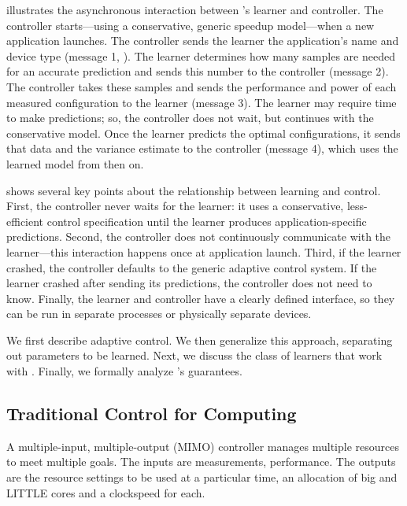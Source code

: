  illustrates the asynchronous interaction between
\SYSTEM{}'s learner and controller. The controller starts---using a
conservative, generic speedup model---when a new application launches.
The controller sends the learner the application's name and device
type (message 1, ).  The learner determines how
many samples are needed for an accurate prediction and sends this
number to the controller (message 2).  The controller takes these
samples and sends the performance and power of each measured
configuration to the learner (message 3).  The learner may require
time to make predictions; so, the controller does not wait, but
continues with the conservative model.  Once the learner predicts the
optimal configurations, it sends that data and the variance estimate
to the controller (message 4), which uses the learned model from then
on.

 shows several key points about the relationship
between learning and control.  First, the controller never waits for
the learner: it uses a conservative, less-efficient control
specification until the learner produces application-specific
predictions.  Second, the controller does not continuously communicate
with the learner---this interaction happens once at application
launch.  Third, if the learner crashed, the controller defaults to the
generic adaptive control system.  If the learner crashed after sending
its predictions, the controller does not need to know.  Finally, the
learner and controller have a clearly defined interface, so they can
be run in separate processes or physically separate devices.

We first describe adaptive control.  We then generalize this approach,
separating out parameters to be learned.  Next, we discuss the class
of learners that work with \SYSTEM{}.  Finally, we formally analyze
\SYSTEM{}'s guarantees.


\subsection{Traditional Control for Computing}
A multiple-input, multiple-output (MIMO) controller manages multiple
resources to meet multiple goals.  The inputs are measurements, \eg{}
performance.  The outputs are the resource settings to be used at a
particular time, \eg{} an allocation of big and LITTLE cores and a
clockspeed for each.

